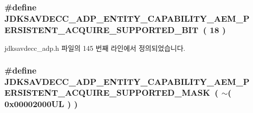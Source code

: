 \subsubsection[{\texorpdfstring{J\+D\+K\+S\+A\+V\+D\+E\+C\+C\+\_\+\+A\+D\+P\+\_\+\+E\+N\+T\+I\+T\+Y\+\_\+\+C\+A\+P\+A\+B\+I\+L\+I\+T\+Y\+\_\+\+A\+E\+M\+\_\+\+P\+E\+R\+S\+I\+S\+T\+E\+N\+T\+\_\+\+A\+C\+Q\+U\+I\+R\+E\+\_\+\+S\+U\+P\+P\+O\+R\+T\+E\+D\+\_\+\+B\+IT}{JDKSAVDECC_ADP_ENTITY_CAPABILITY_AEM_PERSISTENT_ACQUIRE_SUPPORTED_BIT}}]{\setlength{\rightskip}{0pt plus 5cm}\#define J\+D\+K\+S\+A\+V\+D\+E\+C\+C\+\_\+\+A\+D\+P\+\_\+\+E\+N\+T\+I\+T\+Y\+\_\+\+C\+A\+P\+A\+B\+I\+L\+I\+T\+Y\+\_\+\+A\+E\+M\+\_\+\+P\+E\+R\+S\+I\+S\+T\+E\+N\+T\+\_\+\+A\+C\+Q\+U\+I\+R\+E\+\_\+\+S\+U\+P\+P\+O\+R\+T\+E\+D\+\_\+\+B\+IT~( 18 )}\hypertarget{group__adp__entity__capability_ga37d3dd73ca4fd312aab56dbb1e1030c4}{}\label{group__adp__entity__capability_ga37d3dd73ca4fd312aab56dbb1e1030c4}


jdksavdecc\+\_\+adp.\+h 파일의 145 번째 라인에서 정의되었습니다.

\subsubsection[{\texorpdfstring{J\+D\+K\+S\+A\+V\+D\+E\+C\+C\+\_\+\+A\+D\+P\+\_\+\+E\+N\+T\+I\+T\+Y\+\_\+\+C\+A\+P\+A\+B\+I\+L\+I\+T\+Y\+\_\+\+A\+E\+M\+\_\+\+P\+E\+R\+S\+I\+S\+T\+E\+N\+T\+\_\+\+A\+C\+Q\+U\+I\+R\+E\+\_\+\+S\+U\+P\+P\+O\+R\+T\+E\+D\+\_\+\+M\+A\+SK}{JDKSAVDECC_ADP_ENTITY_CAPABILITY_AEM_PERSISTENT_ACQUIRE_SUPPORTED_MASK}}]{\setlength{\rightskip}{0pt plus 5cm}\#define J\+D\+K\+S\+A\+V\+D\+E\+C\+C\+\_\+\+A\+D\+P\+\_\+\+E\+N\+T\+I\+T\+Y\+\_\+\+C\+A\+P\+A\+B\+I\+L\+I\+T\+Y\+\_\+\+A\+E\+M\+\_\+\+P\+E\+R\+S\+I\+S\+T\+E\+N\+T\+\_\+\+A\+C\+Q\+U\+I\+R\+E\+\_\+\+S\+U\+P\+P\+O\+R\+T\+E\+D\+\_\+\+M\+A\+SK~( $\sim$( 0x00002000\+U\+L ) )}\hypertarget{group__adp__entity__capability_gadef932c36c7432245d44c7ad2d978595}{}\label{group__adp__entity__capability_gadef932c36c7432245d44c7ad2d978595}


